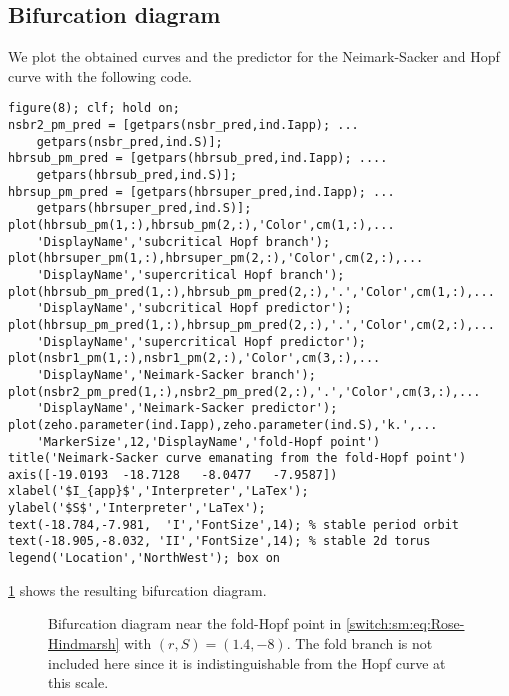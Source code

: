 \subsection{Bifurcation diagram}
We plot the obtained curves and the predictor for the Neimark-Sacker and Hopf curve with the following code.
\begin{lstlisting}[style=customMatlab]
%% Plot comparing computed and predicted Neimark-Sacker curve
figure(8); clf; hold on;
nsbr2_pm_pred = [getpars(nsbr_pred,ind.Iapp); ...
    getpars(nsbr_pred,ind.S)];
hbrsub_pm_pred = [getpars(hbrsub_pred,ind.Iapp); ....
    getpars(hbrsub_pred,ind.S)];
hbrsup_pm_pred = [getpars(hbrsuper_pred,ind.Iapp); ...
    getpars(hbrsuper_pred,ind.S)];
plot(hbrsub_pm(1,:),hbrsub_pm(2,:),'Color',cm(1,:),...
    'DisplayName','subcritical Hopf branch');
plot(hbrsuper_pm(1,:),hbrsuper_pm(2,:),'Color',cm(2,:),...
    'DisplayName','supercritical Hopf branch');
plot(hbrsub_pm_pred(1,:),hbrsub_pm_pred(2,:),'.','Color',cm(1,:),...
    'DisplayName','subcritical Hopf predictor');
plot(hbrsup_pm_pred(1,:),hbrsup_pm_pred(2,:),'.','Color',cm(2,:),...
    'DisplayName','supercritical Hopf predictor');
plot(nsbr1_pm(1,:),nsbr1_pm(2,:),'Color',cm(3,:),...
    'DisplayName','Neimark-Sacker branch');
plot(nsbr2_pm_pred(1,:),nsbr2_pm_pred(2,:),'.','Color',cm(3,:),...
    'DisplayName','Neimark-Sacker predictor');
plot(zeho.parameter(ind.Iapp),zeho.parameter(ind.S),'k.',...
    'MarkerSize',12,'DisplayName','fold-Hopf point')
title('Neimark-Sacker curve emanating from the fold-Hopf point')
axis([-19.0193  -18.7128   -8.0477   -7.9587])
xlabel('$I_{app}$','Interpreter','LaTex');
ylabel('$S$','Interpreter','LaTex');
text(-18.784,-7.981,  'I','FontSize',14); % stable period orbit
text(-18.905,-8.032, 'II','FontSize',14); % stable 2d torus
legend('Location','NorthWest'); box on
\end{lstlisting}
\cref{switch:sm:fig:RH_bifurcation_diagram_II} shows the resulting bifurcation diagram.

\begin{figure}
\caption{Bifurcation diagram near the fold-Hopf point in \cref{switch:sm:eq:Rose-Hindmarsh} with $(r,S)=(1.4,-8)$. The fold branch is not included here since it is indistinguishable from the Hopf curve at this scale.}
\label{switch:sm:fig:RH_bifurcation_diagram_II}
\end{figure}

